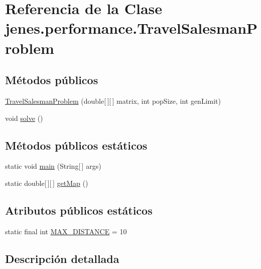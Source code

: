 \hypertarget{classjenes_1_1performance_1_1_travel_salesman_problem}{\section{Referencia de la Clase jenes.\-performance.\-Travel\-Salesman\-Problem}
\label{classjenes_1_1performance_1_1_travel_salesman_problem}
}
\subsection*{Métodos públicos}
\begin{DoxyCompactItemize}
\item 
\hyperlink{classjenes_1_1performance_1_1_travel_salesman_problem_a1c5f34122ccb13c01584d05f0c7a1d61}{Travel\-Salesman\-Problem} (double\mbox{[}$\,$\mbox{]}\mbox{[}$\,$\mbox{]} matrix, int pop\-Size, int gen\-Limit)
\item 
void \hyperlink{classjenes_1_1performance_1_1_travel_salesman_problem_a2f0d24ae04735fe7926f2b647809692d}{solve} ()
\end{DoxyCompactItemize}
\subsection*{Métodos públicos estáticos}
\begin{DoxyCompactItemize}
\item 
static void \hyperlink{classjenes_1_1performance_1_1_travel_salesman_problem_ab2888d221761235635b6909357f6647c}{main} (String\mbox{[}$\,$\mbox{]} args)
\item 
static double\mbox{[}$\,$\mbox{]}\mbox{[}$\,$\mbox{]} \hyperlink{classjenes_1_1performance_1_1_travel_salesman_problem_a0a22dfc28881be8cf6a73e8f90a169e1}{get\-Map} ()
\end{DoxyCompactItemize}
\subsection*{Atributos públicos estáticos}
\begin{DoxyCompactItemize}
\item 
static final int \hyperlink{classjenes_1_1performance_1_1_travel_salesman_problem_aceff750d55c6086531bf25b73289ac4e}{M\-A\-X\-\_\-\-D\-I\-S\-T\-A\-N\-C\-E} = 10
\end{DoxyCompactItemize}


\subsection{Descripción detallada}



